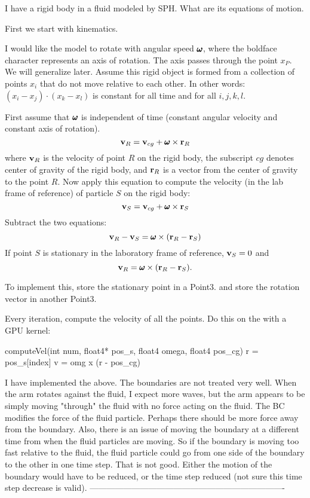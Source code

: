 \documentclass[11pt]{article}
\begin{document}
I have a rigid body in a fluid modeled by SPH. What are its equations 
of motion. 

First we start with kinematics. 

I would like the model to rotate with angular speed $\omgvec$, where the 
boldface character represents an axis of rotation. The axis passes
through the point $x_P$.  We will generalize later. Assume this rigid
object is formed from a collection of points $x_i$ that do not move 
relative to each other. In other words: $(x_i-x_j)\cdot(x_k-x_l)$ is 
constant for all time and for all $i,j,k,l$. 

First assume that $\omgvec$ is independent of time (constant angular
velocity and constant axis of rotation).
$$
\vvec_R = \vvec_{cg} + \omgvec \times \rvec_R
$$
where ${\bf v}_R$ is the velocity of point $R$ on the rigid body, the 
subscript $cg$  denotes center of gravity of the rigid body, 
and ${\bf r}_R$ is a vector from the center of gravity to the point $R$. 
Now apply this equation to compute the velocity (in the lab frame of 
reference) of particle $S$ on the rigid body: 
$$
\vvec_S = \vvec_{cg} + \omgvec \times \rvec_S
$$
Subtract the two equations: 
$$
\vvec_R-\vvec_S = \omgvec \times (\rvec_R-\rvec_S)
$$
If point $S$ is stationary in the laboratory frame of reference, 
${\bf v}_S=0$ and
$$
\vvec_R = \omgvec \times (\rvec_R-\rvec_S) .
$$

To implement this, store the stationary point in a Point3.
and store the rotation vector in another Point3. 

Every iteration, compute the velocity of all the points. Do this on the 
with a GPU kernel: 

computeVel(int num, float4* pos_s, float4 omega, float4 pos_cg)
{
    r = pos_s[index] 
	v = omg x (r - pos_cg)
}

I have implemented the above. The boundaries are not treated very well. When the arm rotates against the fluid, I expect more waves, but the arm appears to be simply moving "through" the fluid with no force acting on the fluid. The BC modifies the force of the fluid
particle. Perhaps there should be more force away from the boundary. 
Also, there is an issue of moving the boundary at a different time from when the fluid particles are moving. So if the boundary is moving too fast relative to the fluid, the fluid
particle could go from one side of the boundary to the other in one time step. That is not good. Either the motion of the boundary would have to be reduced, or the time step reduced (not sure this time step decrease is valid).
----------------------------------------------------------------------
\end{document}
